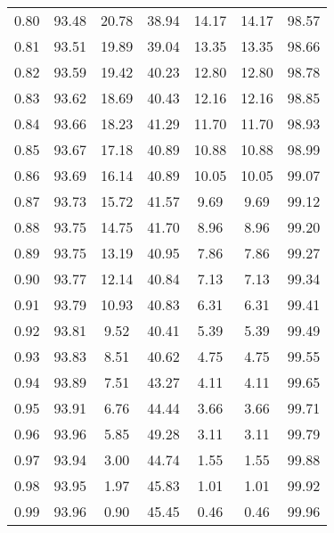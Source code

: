 \begin{tabular}{|c|c|c|c|c|c|c|}
      0.80 &     93.48 &     20.78 &      38.94 &   14.17 &      14.17 &         98.57 \\
      0.81 &     93.51 &     19.89 &      39.04 &   13.35 &      13.35 &         98.66 \\
      0.82 &     93.59 &     19.42 &      40.23 &   12.80 &      12.80 &         98.78 \\
      0.83 &     93.62 &     18.69 &      40.43 &   12.16 &      12.16 &         98.85 \\
      0.84 &     93.66 &     18.23 &      41.29 &   11.70 &      11.70 &         98.93 \\
      0.85 &     93.67 &     17.18 &      40.89 &   10.88 &      10.88 &         98.99 \\
      0.86 &     93.69 &     16.14 &      40.89 &   10.05 &      10.05 &         99.07 \\
      0.87 &     93.73 &     15.72 &      41.57 &    9.69 &       9.69 &         99.12 \\
      0.88 &     93.75 &     14.75 &      41.70 &    8.96 &       8.96 &         99.20 \\
      0.89 &     93.75 &     13.19 &      40.95 &    7.86 &       7.86 &         99.27 \\
      0.90 &     93.77 &     12.14 &      40.84 &    7.13 &       7.13 &         99.34 \\
      0.91 &     93.79 &     10.93 &      40.83 &    6.31 &       6.31 &         99.41 \\
      0.92 &     93.81 &      9.52 &      40.41 &    5.39 &       5.39 &         99.49 \\
      0.93 &     93.83 &      8.51 &      40.62 &    4.75 &       4.75 &         99.55 \\
      0.94 &     93.89 &      7.51 &      43.27 &    4.11 &       4.11 &         99.65 \\
      0.95 &     93.91 &      6.76 &      44.44 &    3.66 &       3.66 &         99.71 \\
      0.96 &     93.96 &      5.85 &      49.28 &    3.11 &       3.11 &         99.79 \\
      0.97 &     93.94 &      3.00 &      44.74 &    1.55 &       1.55 &         99.88 \\
      0.98 &     93.95 &      1.97 &      45.83 &    1.01 &       1.01 &         99.92 \\
      0.99 &     93.96 &      0.90 &      45.45 &    0.46 &       0.46 &         99.96 \\
\bottomrule
\end{tabular}
